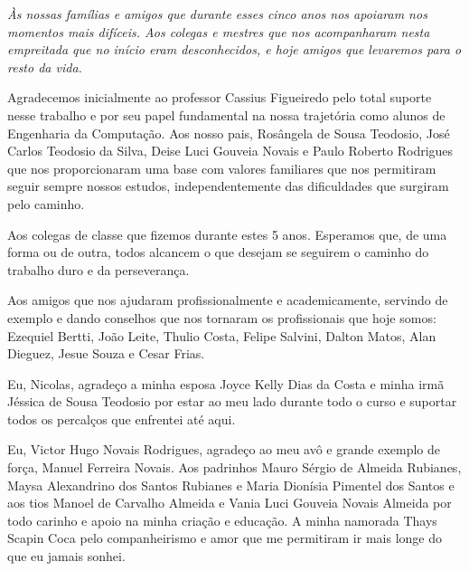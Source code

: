 \cleardoublepage
\thispagestyle{empty}
\vspace*{200mm}

\begin{flushright}
{\em 
Às nossas famílias e amigos que durante esses cinco anos nos apoiaram nos momentos mais difíceis.
Aos colegas e mestres que nos acompanharam nesta empreitada que no início eram desconhecidos, e hoje amigos que levaremos para o resto da vida.
}
\end{flushright}
\newpage


\hspace{5mm}
Agradecemos inicialmente ao professor Cassius Figueiredo pelo total suporte nesse trabalho e por seu papel fundamental na nossa trajetória como alunos de Engenharia da Computação. Aos nosso pais, Rosângela de Sousa Teodosio, José Carlos Teodosio da Silva, Deise Luci Gouveia Novais e Paulo Roberto Rodrigues que nos proporcionaram uma base com valores familiares que nos permitiram seguir sempre nossos estudos, independentemente das dificuldades que surgiram pelo caminho.

Aos colegas de classe que fizemos durante estes 5 anos. Esperamos que, de uma forma ou de outra, todos alcancem o que desejam se seguirem o caminho do trabalho duro e da perseverança.

Aos amigos que nos ajudaram profissionalmente e academicamente, servindo de exemplo e dando conselhos que nos tornaram os profissionais que hoje somos: Ezequiel Bertti, João Leite, Thulio Costa, Felipe Salvini, Dalton Matos, Alan Dieguez, Jesue Souza e Cesar Frias.

Eu, Nicolas, agradeço a minha esposa Joyce Kelly Dias da Costa e minha irmã Jéssica de Sousa Teodosio por estar ao meu lado durante todo o curso e suportar todos os percalços que enfrentei até aqui.

Eu, Victor Hugo Novais Rodrigues, agradeço ao meu avô e grande exemplo de força, Manuel Ferreira Novais. Aos padrinhos Mauro Sérgio de Almeida Rubianes, Maysa Alexandrino dos Santos Rubianes e Maria Dionísia Pimentel dos Santos e aos tios Manoel de Carvalho Almeida e Vania Luci Gouveia Novais Almeida por todo carinho e apoio na minha criação e educação. A minha namorada Thays Scapin Coca pelo companheirismo e amor que me permitiram ir mais longe do que eu jamais sonhei.

